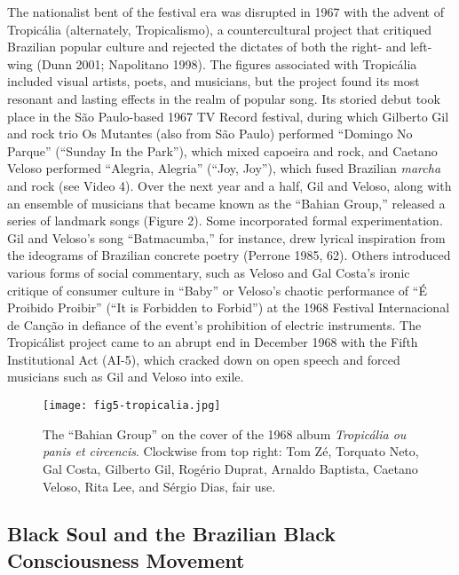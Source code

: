 \documentclass[twoside]{article}
\begin{document}
The nationalist bent of the festival era was disrupted in 1967 with the
advent of Tropicália (alternately, Tropicalismo), a countercultural
project that critiqued Brazilian popular culture and rejected the
dictates of both the right- and left-wing (Dunn 2001; Napolitano 1998).
The figures associated with Tropicália included visual artists, poets,
and musicians, but the project found its most resonant and lasting
effects in the realm of popular song. Its storied debut took place in
the São Paulo-based 1967 TV Record festival, during which Gilberto Gil
and rock trio Os Mutantes (also from São Paulo) performed ``Domingo No
Parque'' (``Sunday In the Park''), which mixed capoeira and rock, and
Caetano Veloso performed ``Alegria, Alegria'' (``Joy, Joy''), which
fused Brazilian \emph{marcha} and rock (see Video 4). Over the next year
and a half, Gil and Veloso, along with an ensemble of musicians that
became known as the ``Bahian Group,'' released a series of landmark
songs (Figure 2). Some incorporated formal experimentation. Gil and
Veloso's song ``Batmacumba,'' for instance, drew lyrical inspiration
from the ideograms of Brazilian concrete poetry (Perrone 1985, 62).
Others introduced various forms of social commentary, such as Veloso and
Gal Costa's ironic critique of consumer culture in ``Baby'' or Veloso's
chaotic performance of ``É Proibido Proibir'' (``It is Forbidden to
Forbid'') at the 1968 Festival Internacional de Canção in defiance of
the event's prohibition of electric instruments. The Tropicálist project
came to an abrupt end in December 1968 with the Fifth Institutional Act
(AI-5), which cracked down on open speech and forced musicians such as
Gil and Veloso into exile.

\begin{figure}
  \texttt{[image: fig5-tropicalia.jpg]}
  \caption{The ``Bahian Group'' on the cover of the 1968 album \emph{Tropicália ou panis et
  circencis}. Clockwise from top right: Tom Zé, Torquato Neto, Gal
  Costa, Gilberto Gil, Rogério Duprat, Arnaldo Baptista, Caetano Veloso,
  Rita Lee, and Sérgio Dias, fair use.}
\end{figure}

\hypertarget{black-soul-and-the-brazilian-black-consciousness-movement}{%
\subsection*{Black Soul and the Brazilian Black Consciousness
Movement}\label{black-soul-and-the-brazilian-black-consciousness-movement}}
\end{document}
